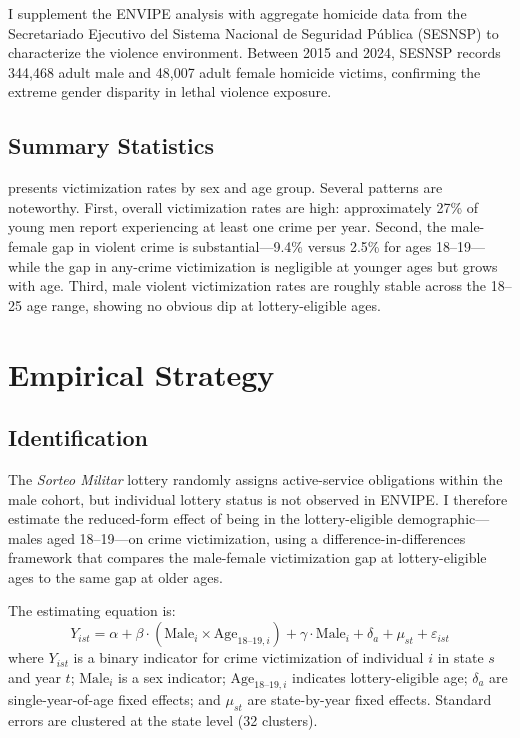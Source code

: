 \documentclass[12pt]{article}
\begin{document}
I supplement the ENVIPE analysis with aggregate homicide data from the Secretariado Ejecutivo del Sistema Nacional de Seguridad P{\'u}blica (SESNSP) to characterize the violence environment. Between 2015 and 2024, SESNSP records 344,468 adult male and 48,007 adult female homicide victims, confirming the extreme gender disparity in lethal violence exposure.

\subsection{Summary Statistics}

 presents victimization rates by sex and age group. Several patterns are noteworthy. First, overall victimization rates are high: approximately 27\% of young men report experiencing at least one crime per year. Second, the male-female gap in violent crime is substantial---9.4\% versus 2.5\% for ages 18--19---while the gap in any-crime victimization is negligible at younger ages but grows with age. Third, male violent victimization rates are roughly stable across the 18--25 age range, showing no obvious dip at lottery-eligible ages.




\section{Empirical Strategy}
\label{sec:strategy}

\subsection{Identification}

The \textit{Sorteo Militar} lottery randomly assigns active-service obligations within the male cohort, but individual lottery status is not observed in ENVIPE. I therefore estimate the reduced-form effect of being in the lottery-eligible demographic---males aged 18--19---on crime victimization, using a difference-in-differences framework that compares the male-female victimization gap at lottery-eligible ages to the same gap at older ages.

The estimating equation is:
\begin{equation}
Y_{ist} = \alpha + \beta \cdot (\text{Male}_i \times \text{Age}_{18\text{--}19,i}) + \gamma \cdot \text{Male}_i + \delta_a + \mu_{st} + \varepsilon_{ist}
\label{eq:main}
\end{equation}
where $Y_{ist}$ is a binary indicator for crime victimization of individual $i$ in state $s$ and year $t$; $\text{Male}_i$ is a sex indicator; $\text{Age}_{18\text{--}19,i}$ indicates lottery-eligible age; $\delta_a$ are single-year-of-age fixed effects; and $\mu_{st}$ are state-by-year fixed effects. Standard errors are clustered at the state level (32 clusters).
\end{document}
